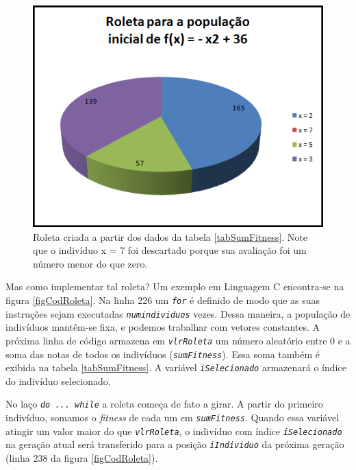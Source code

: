 	
	\begin{figure}[htp]
		\begin{center}
			\includegraphics[width=13cm]{figs/ga/roleta_viciada.png}
		\end{center}
		\caption{\label{figRoleta}Roleta criada a partir dos dados da tabela \ref{tabSumFitness}. Note que o indivíduo x = 7 foi descartado porque sua avaliação foi um número menor do que zero.}
	\end{figure}
	
	Mas como implementar tal roleta? Um exemplo em Linguagem C encontra-se na figura \ref{figCodRoleta}. Na linha 226 um \textit{\texttt{for}} é definido de modo que as suas instruções sejam executadas \textit{\texttt{numindividuos}} vezes. Dessa maneira, a população de indivíduos mantêm-se fixa, e podemos trabalhar com vetores constantes. A próxima linha de código armazena em \textit{\texttt{vlrRoleta}} um número aleatório entre 0 e a soma das notas de todos os indivíduos (\textit{\texttt{sumFitness}}). Essa soma também é exibida na tabela \ref{tabSumFitness}. A variável \textit{\texttt{iSelecionado}} armazenará o índice do indivíduo selecionado.
	
	No laço \textit{\texttt{do ... while}} a roleta começa de fato a girar. A partir do primeiro indivíduo, somamos o \textit{fitness} de cada um em \textit{\texttt{sumFitness}}. Quando essa variável atingir um valor maior do que \textit{\texttt{vlrRoleta}}, o indivíduo com índice \textit{\texttt{iSelecionado}} na geração atual será transferido para a posição \textit{\texttt{iIndividuo}} da próxima geração (linha 238 da figura \ref{figCodRoleta}). 
	
